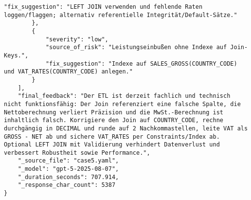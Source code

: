\begin{lstlisting}[caption={Ausgabe: GPT-5 Anwendungsfall 5 Hauptdurchlauf},label={gpt_case5_prompt1}]
            "fix_suggestion": "LEFT JOIN verwenden und fehlende Raten loggen/flaggen; alternativ referentielle Integrität/Default-Sätze."
        },
        {
            "severity": "low",
            "source_of_risk": "Leistungseinbußen ohne Indexe auf Join-Keys.",
            "fix_suggestion": "Indexe auf SALES_GROSS(COUNTRY_CODE) und VAT_RATES(COUNTRY_CODE) anlegen."
        }
    ],
    "final_feedback": "Der ETL ist derzeit fachlich und technisch nicht funktionsfähig: Der Join referenziert eine falsche Spalte, die Nettoberechnung verliert Präzision und die MwSt.-Berechnung ist inhaltlich falsch. Korrigiere den Join auf COUNTRY_CODE, rechne durchgängig in DECIMAL und runde auf 2 Nachkommastellen, leite VAT als GROSS - NET ab und sichere VAT_RATES per Constraints/Index ab. Optional LEFT JOIN mit Validierung verhindert Datenverlust und verbessert Robustheit sowie Performance.",
    "_source_file": "case5.yaml",
    "_model": "gpt-5-2025-08-07",
    "_duration_seconds": 707.914,
    "_response_char_count": 5387
}
\end{lstlisting}

